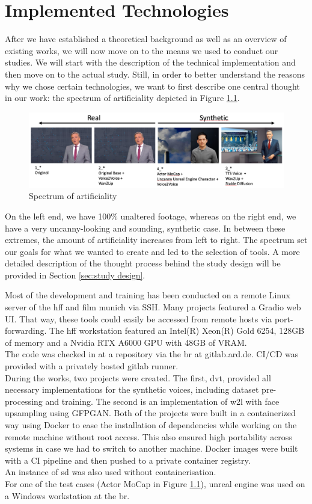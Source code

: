 \documentclass[
  a4paper,  %
  twoside,  %
  bibliography=totoc,
  headsepline,
  cleardoublepage=empty,
  parskip=half,
  draft=false
]{scrbook}
\begin{document}
\chapter{Implemented Technologies}
\label{chap:implementation}
After we have established a theoretical background as well as an overview of existing works, we will now move on to the means we used to conduct our studies. We will start with the description of the technical implementation and then move on to the actual study. Still, in order to better understand the reasons why we chose certain technologies, we want to first describe one central thought in our work: the spectrum of artificiality depicted in Figure \ref{fig:spectrum}.
\begin{figure}[h]
  \centering
  \includegraphics[width=1\textwidth]{./graphics/images/spectrum-art.png}
  \caption{Spectrum of artificiality}
  \label{fig:spectrum}
\end{figure}
On the left end, we have 100\% unaltered footage, whereas on the right end, we have a very uncanny-looking and sounding, synthetic case. In between these extremes, the amount of artificiality increases from left to right. The spectrum set our goals for what we wanted to create and led to the selection of tools. A more detailed description of the thought process behind the study design will be provided in Section \ref{sec:study design}.

Most of the development and training has been conducted on a remote Linux server of the \gls{hff} and film munich via SSH. Many projects featured a Gradio web UI. That way, these tools could easily be accessed from remote hosts via port-forwarding. The \gls{hff} workstation featured an Intel(R) Xeon(R) Gold 6254, 128GB of memory and a Nvidia RTX A6000 GPU with 48GB of VRAM. \\
The code was checked in at a repository via the \gls{br} at gitlab.ard.de. CI/CD was provided with a privately hosted gitlab runner. \\
During the works, two projects were created. The first, \gls{dvt}, provided all necessary implementations for the synthetic voices, including dataset pre-processing and training. The second is an implementation of \gls{w2l} with face upsampling using GFPGAN. Both of the projects were built in a containerized way using Docker to ease the installation of dependencies while working on the remote machine without root access. This also ensured high portability across systems in case we had to switch to another machine. Docker images were built with a CI pipeline and then pushed to a private container registry. \\
An instance of \gls{sd} was also used without containerisation.  \\
For one of the test cases (Actor MoCap in Figure \ref{fig:spectrum}), unreal engine was used on a Windows workstation at the \gls{br}.
\end{document}
